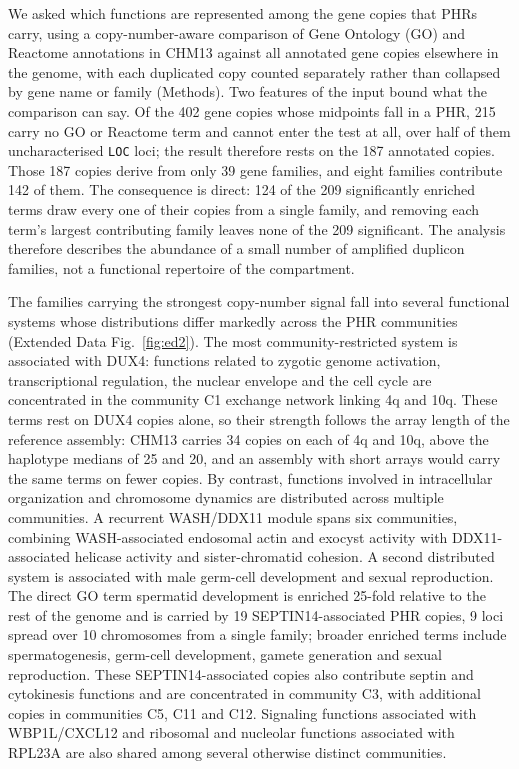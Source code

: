 \documentclass[pdflatex,mathphys]{jnl}
\begin{document}
We asked which functions are represented among the gene copies that PHRs carry,
using a copy-number-aware comparison of Gene Ontology (GO)
\cite{GeneOntologyConsortium2026} and Reactome \cite{Reactome2024} annotations
in CHM13 against all annotated gene copies elsewhere in the genome, with each
duplicated copy counted separately rather than collapsed by gene name or family
(Methods). Two features of the input bound what the comparison can say. Of the
402 gene copies whose midpoints fall in a PHR, 215 carry no GO or Reactome term
and cannot enter the test at all, over half of them uncharacterised \texttt{LOC}
loci; the result therefore rests on the 187 annotated copies. Those 187 copies
derive from only 39 gene families, and eight families contribute 142 of them.
The consequence is direct: 124 of the 209 significantly enriched terms draw every
one of their copies from a single family, and removing each term's largest contributing family
leaves none of the 209 significant. The analysis therefore describes the
abundance of a small number of amplified duplicon families, not a functional
repertoire of the compartment.

The families carrying the strongest copy-number signal fall into several
functional systems whose distributions differ markedly across the PHR communities (Extended Data Fig.~\ref{fig:ed2}). The most
community-restricted system is associated with DUX4: functions related to
zygotic genome activation, transcriptional regulation, the nuclear envelope and
the cell cycle are concentrated in the community C1 exchange network linking 4q and 10q.
These terms rest on DUX4 copies alone, so their strength follows the array length of
the reference assembly: CHM13 carries 34 copies on each of 4q and 10q, above the haplotype
medians of 25 and 20, and an assembly with short arrays would carry the same terms on
fewer copies.
By contrast, functions involved in intracellular organization and chromosome
dynamics are distributed across multiple communities. A recurrent WASH/DDX11
module spans six communities, combining WASH-associated endosomal actin and
exocyst activity with DDX11-associated helicase activity and sister-chromatid
cohesion. A second distributed system is associated with male germ-cell
development and sexual reproduction. The direct GO term spermatid development
is enriched 25-fold relative to the rest of the genome and is carried by 19
SEPTIN14-associated PHR copies, 9 loci spread over 10 chromosomes from a single
family;
broader enriched terms include spermatogenesis, germ-cell development, gamete
generation and sexual reproduction. These SEPTIN14-associated copies also contribute septin and
cytokinesis functions and are concentrated in community C3, with additional copies in
communities C5, C11 and C12. Signaling functions associated with WBP1L/CXCL12 and ribosomal
and nucleolar functions associated with RPL23A are also shared among several
otherwise distinct communities.
\end{document}
